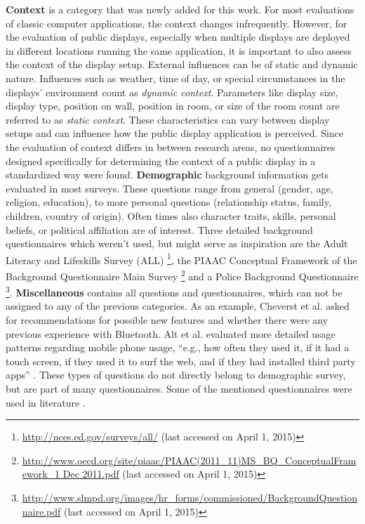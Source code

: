 	\textbf{Context} is a category that was newly added for this work. For most evaluations of classic computer applications, the context changes infrequently. However, for the evaluation of public displays, especially when multiple displays are deployed in different locations running the same application, it is important to also assess the context of the display setup. External influences can be of static and dynamic nature. Influences such as weather, time of day, or special circumstances in the displays' environment count as \textit{dynamic context}. Parameters like display size, display type, position on wall, position in room, or size of the room count are referred to as \textit{static context}. These characteristics can vary between display setups and can influence how the public display application is perceived. Since the evaluation of context differs in between research areas, no questionnaires designed specifically for determining the context of a public display in a standardized way were found. 
	\textbf{Demographic} background information gets evaluated in most surveys. These questions range from general (gender, age, religion, education), to more personal questions (relationship status, family, children, country of origin). Often times also character traits, skills, personal beliefs, or political affiliation are of interest.
	Three detailed background questionnaires which weren't used, but might serve as inspiration are the Adult Literacy and Lifeskills Survey (ALL) \footnote{\url{http://nces.ed.gov/surveys/all/} (last accessed on April 1, 2015)}, the PIAAC Conceptual Framework of the Background Questionnaire Main Survey \footnote{\url{http://www.oecd.org/site/piaac/PIAAC(2011_11)MS_BQ_ConceptualFramework_1 Dec 2011.pdf} (last accessed on April 1, 2015)} and a Police Background Questionnaire \footnote{\url{http://www.slmpd.org/images/hr_forms/commissioned/BackgroundQuestionnaire.pdf} (last accessed on April 1, 2015)}.
	\textbf{Miscellaneous} contains all questions and questionnaires, which can not be assigned to any of the previous categories. As an example, Cheverst et al. \cite{cheverst2005hermes} asked for recommendations for possible new features and whether there were any previous experience with Bluetooth. Alt et al. evaluated more detailed usage patterns regarding mobile phone usage, ``e.g., how often they used it, if it had a touch screen, if they used it to surf the web, and if they had installed third party apps'' \cite{alt2011digifieds}. These types of questions do not directly belong to demographic survey, but are part of many questionnaires. Some of the mentioned questionnaires were used in literature \cite{Huang2004, jacucci2010worldsofinformation, ojala2010ubi}.








